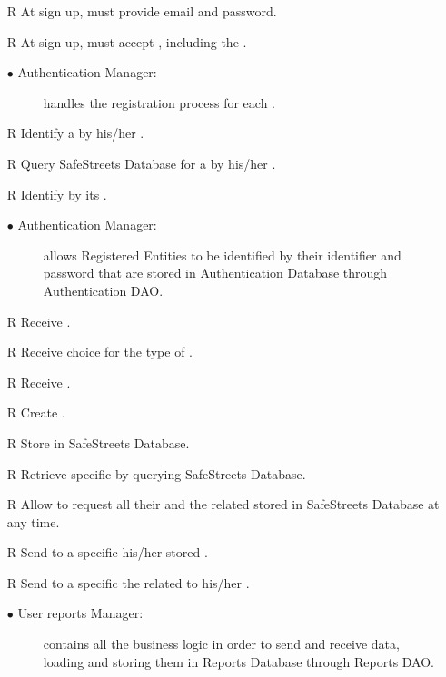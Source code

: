 \documentclass[../DD.tex]{subfiles}
\begin{document}
\begin{itemize}
	\item[R\subs{1}]At sign up,  must provide email and password.
	\item[R\subs{2}]At sign up,  must accept , including the .
	\begin{description}
	 \item[$\bullet$ Authentication Manager:] handles the registration process for each .
	\end{description}

	\item[R\subs{3}]Identify a  by his/her .
	\item[R\subs{13}]Query SafeStreets Database for a  by his/her .
	\item[R\subs{29}]Identify  by its .
	\begin{description}
	\item[$\bullet$ Authentication Manager:] allows Registered Entities to be identified by their identifier and password that are stored in Authentication Database through Authentication DAO.
	\end{description}

	\item[R\subs{4}]Receive .
	\item[R\subs{5}]Receive  choice for the type of .
	\item[R\subs{6}]Receive .
	\item[R\subs{9}]Create .
	\item[R\subs{10}]Store  in SafeStreets Database.
	\item[R\subs{14}]Retrieve specific  by querying SafeStreets Database.
	\item[R\subs{20}]Allow  to request all their  and the related  stored in SafeStreets Database at any time.
	\item[R\subs{21}]Send to a specific  his/her stored .
	\item[R\subs{22}]Send to a specific  the  related to his/her .
	\begin{description}
	\item[$\bullet$ User reports Manager:] contains all the business logic in order to send and receive  data, loading and storing them in Reports Database through Reports DAO.
	\end{description}


\end{itemize}
\end{document}
